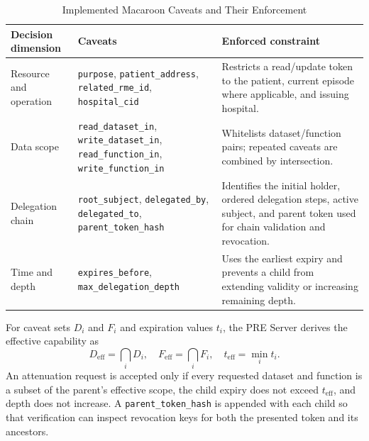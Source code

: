 \begin{table}[t]
	\caption{Implemented Macaroon Caveats and Their Enforcement}
	\label{tab:caveats}
	\centering
	\small
	\setlength{\tabcolsep}{4pt}
	\begin{tabular}{@{}p{}p{}p{}@{}}
		\toprule
		\textbf{Decision dimension}                                                                                        & \textbf{Caveats} & \textbf{Enforced constraint} \\
		\midrule
		Resource and operation                                                                                             &
		\texttt{purpose}, \texttt{patient\_address}, \texttt{related\_rme\_id}, \texttt{hospital\_cid}                     &
		Restricts a read/update token to the patient, current episode where applicable, and issuing hospital.                                                                \\
		Data scope                                                                                                         &
		\texttt{read\_dataset\_in}, \texttt{write\_dataset\_in}, \texttt{read\_function\_in}, \texttt{write\_function\_in} &
		Whitelists dataset/function pairs; repeated caveats are combined by intersection.                                                                                    \\
		Delegation chain                                                                                                   &
		\texttt{root\_subject}, \texttt{delegated\_by}, \texttt{delegated\_to}, \texttt{parent\_token\_hash}               &
		Identifies the initial holder, ordered delegation steps, active subject, and parent token used for chain validation and revocation.                                  \\
		Time and depth                                                                                                     &
		\texttt{expires\_before}, \texttt{max\_delegation\_depth}                                                          &
		Uses the earliest expiry and prevents a child from extending validity or increasing remaining depth.                                                                 \\
		\bottomrule
	\end{tabular}
\end{table}

For caveat sets $D_i$ and $F_i$ and expiration values $t_i$, the PRE Server derives the effective capability as
\begin{equation}
	D_{\mathrm{eff}}=\bigcap_i D_i,\quad
	F_{\mathrm{eff}}=\bigcap_i F_i,\quad
	t_{\mathrm{eff}}=\min_i t_i .
	\label{eq:effective-capability}
\end{equation}
An attenuation request is accepted only if every requested dataset and function is a subset of the parent's effective scope, the child expiry does not exceed $t_{\mathrm{eff}}$, and depth does not increase. A \texttt{parent\_token\_hash} is appended with each child so that verification can inspect revocation keys for both the presented token and its ancestors.

